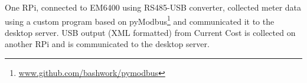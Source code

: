 \documentclass[10pt]{sensys-proc}
\newcommand{\secref}[1]{Section~\ref{#1}}
\newcommand{\tabref}[1]{Table~\ref{#1}}
\newcommand{\selstup}{SeLStUp}
\newcommand{\paradigms}{Sense-Local Store-Upload~}
\begin{document}
 One RPi, connected to EM6400 using RS485-USB converter, collected meter data using a custom program based on pyModbus\footnote{\url{www.github.com/bashwork/pymodbus}} and communicated it to the desktop server. %
USB output (XML formatted) from Current Cost is collected on another RPi and is communicated to the desktop server. %

\end{document}
